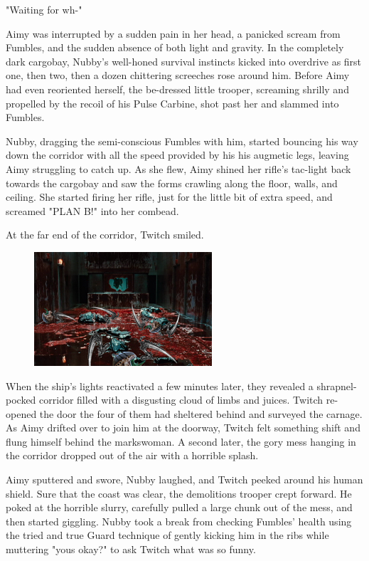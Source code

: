 "Waiting for wh-"

Aimy was interrupted by a sudden pain in her head, a panicked scream from Fumbles, and the sudden absence of both light and gravity. 
In the completely dark cargobay, Nubby's well-honed survival instincts kicked into overdrive as first one, then two, then a dozen chittering screeches rose around him. 
Before Aimy had even reoriented herself, the be-dressed little trooper, screaming shrilly and propelled by the recoil of his Pulse Carbine, shot past her and slammed into Fumbles.

Nubby, dragging the semi-conscious Fumbles with him, started bouncing his way down the corridor with all the speed provided by his his augmetic legs, leaving Aimy struggling to catch up. 
As she flew, Aimy shined her rifle's tac-light back towards the cargobay and saw the forms crawling along the floor, walls, and ceiling. 
She started firing her rifle, just for the little bit of extra speed, and screamed "PLAN B!" into her combead.

At the far end of the corridor, Twitch smiled.
\begin{figure}
	\begin{center}
		\includegraphics[width=\figwidth]{pics/13/5.png}
	\end{center}
\end{figure}
When the ship's lights reactivated a few minutes later, they revealed a shrapnel-pocked corridor filled with a disgusting cloud of limbs and juices. 
Twitch re-opened the door the four of them had sheltered behind and surveyed the carnage. 
As Aimy drifted over to join him at the doorway, Twitch felt something shift and flung himself behind the markswoman. 
A second later, the gory mess hanging in the corridor dropped out of the air with a horrible splash.

Aimy sputtered and swore, Nubby laughed, and Twitch peeked around his human shield. 
Sure that the coast was clear, the demolitions trooper crept forward. 
He poked at the horrible slurry, carefully pulled a large chunk out of the mess, and then started giggling. 
Nubby took a break from checking Fumbles' health using the tried and true Guard technique of gently kicking him in the ribs while muttering "yous okay?" to ask Twitch what was so funny.

